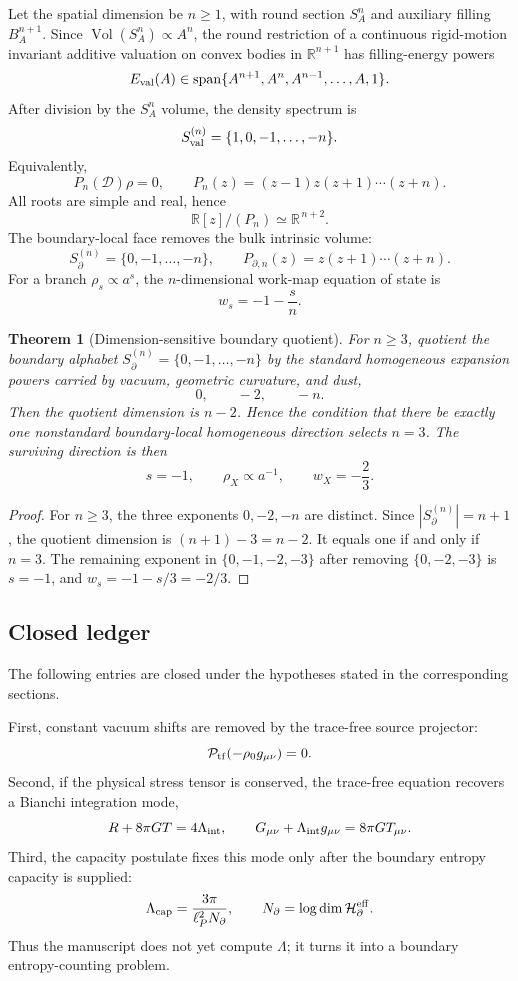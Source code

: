 \documentclass[aps,prd,reprint,nofootinbib,superscriptaddress]{revtex4-2}
\numberwithin{equation}{section}
\theoremstyle{definition}
\theoremstyle{plain}
\newtheorem{theorem}{Theorem}[section]
\newcommand{\Dil}{\mathscr D}
\newcommand{\vol}{\operatorname{Vol}}
\newcommand{\spanop}{\operatorname{span}}
\newcommand{\Ptr}{\mathcal P_{\rm tf}}
\begin{document}
Let the spatial dimension be \(n\ge1\), with round section \(S^n_A\) and
auxiliary filling \(B^{n+1}_A\).  Since \(\vol(S^n_A)\propto A^n\), the
round restriction of a continuous rigid-motion invariant additive valuation
on convex bodies in \(\mathbb R^{n+1}\) has filling-energy powers
\[
E_{\rm val}(A)\in
\spanop\{A^{n+1},A^n,A^{n-1},\ldots,A,1\}.
\]
After division by the \(S^n_A\) volume, the density spectrum is
\[
S_{\rm val}^{(n)}=\{1,0,-1,\ldots,-n\}.
\]
Equivalently,
\begin{equation}
\boxed{
P_n(\Dil)\rho=0,\qquad
P_n(z)=(z-1)z(z+1)\cdots(z+n).
}
\end{equation}
All roots are simple and real, hence
\[
\mathbb R[z]/(P_n)\simeq \mathbb R^{\,n+2}.
\]
The boundary-local face removes the bulk intrinsic volume:
\[
S_{\partial}^{(n)}=\{0,-1,\ldots,-n\},
\qquad
P_{\partial,n}(z)=z(z+1)\cdots(z+n).
\]
For a branch \(\rho_s\propto a^s\), the \(n\)-dimensional work-map equation
of state is
\[
w_s=-1-\frac{s}{n}.
\]

\begin{theorem}[Dimension-sensitive boundary quotient]
\label{thm:dimension-quotient}
For \(n\ge3\), quotient the boundary alphabet
\(S_{\partial}^{(n)}=\{0,-1,\ldots,-n\}\) by the standard homogeneous
expansion powers carried by vacuum, geometric curvature, and dust,
\[
0,\qquad -2,\qquad -n .
\]
Then the quotient dimension is \(n-2\).  Hence the condition that there be
exactly one nonstandard boundary-local homogeneous direction selects
\(n=3\).  The surviving direction is then
\[
\boxed{
s=-1,\qquad
\rho_X\propto a^{-1},\qquad
w_X=-\frac23 .
}
\]
\end{theorem}

\begin{proof}
For \(n\ge3\), the three exponents \(0,-2,-n\) are distinct.  Since
\(|S_{\partial}^{(n)}|=n+1\), the quotient dimension is
\((n+1)-3=n-2\).  It equals one if and only if \(n=3\).  The remaining
exponent in \(\{0,-1,-2,-3\}\) after removing \(\{0,-2,-3\}\) is \(s=-1\),
and \(w_s=-1-s/3=-2/3\).
\end{proof}

\subsection{Closed ledger}

The following entries are closed under the hypotheses stated in the
corresponding sections.

First, constant vacuum shifts are removed by the trace-free source
projector:
\[
\Ptr(-\rho_0g_{\mu\nu})=0.
\]
Second, if the physical stress tensor is conserved, the trace-free equation
recovers a Bianchi integration mode,
\[
R+8\pi GT=4\Lambda_{\rm int},
\qquad
G_{\mu\nu}+\Lambda_{\rm int}g_{\mu\nu}=8\pi GT_{\mu\nu}.
\]
Third, the capacity postulate fixes this mode only after the boundary entropy
capacity is supplied:
\[
\Lambda_{\rm cap}=\frac{3\pi}{\ell_P^2N_\partial},
\qquad
N_\partial=\log\dim \mathcal H_{\partial}^{\rm eff}.
\]
Thus the manuscript does not yet compute \(\Lambda\); it turns it into a
boundary entropy-counting problem.
\end{document}

